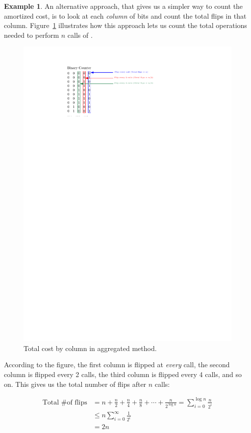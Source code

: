 \documentclass[11pt]{article}
\theoremstyle{definition}
\newtheorem{exmp}{Example}[section]
\begin{document}
\begin{exmp}
An alternative approach, that gives us a simpler way to count the amortized cost, is to look at each \emph{column} of bits and count the
total flips in that column.  Figure~\ref{fig:columns} illustrates how this approach lets us count the total operations needed to perform $n$ calls of .
\begin{figure}[tbh]
\centering
\includegraphics[scale=1]{columns.pdf}
\caption{Total cost by column in aggregated method.}
\label{fig:columns}
\end{figure}

According to the figure, the first column is flipped at \emph{every} call, the second column is flipped every 2 calls, the third column is flipped every 4 calls, and so on.  This gives us the total number of flips after $n$ calls:

\begin{align*}
\text{Total \# of flips} & = n + \frac{n}{2} + \frac{n}{4} + \frac{n}{8} + \cdots + \frac{n}{2^{\log{n}}} = \sum_{i=0}^{\log{n}} \frac{n}{2^i} \\
& \leq n\sum_{i=0}^{\infty} \frac{1}{2^i} \\
& = 2n
\end{align*}


\end{exmp}
\end{document}
